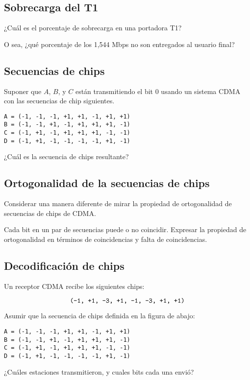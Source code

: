 \documentclass[12pt]{report}
\begin{document}
\begin{exer}
\subsection{Sobrecarga del T1 \sthree}
¿Cuál es el porcentaje de sobrecarga en una portadora T1?

O sea, ¿qué porcentaje de los 1,544 Mbps no son entregados al usuario final?
\end{exer}

\begin{exer}
\subsection{Secuencias de chips \sone}
Suponer que $A$, $B$, y $C$ están transmitiendo el bit 0 usando un sistema CDMA con
las secuencias de chip siguientes.\\


\begin{verbatim}
A = (-1, -1, -1, +1, +1, -1, +1, +1)
B = (-1, -1, +1, -1, +1, +1, +1, -1)
C = (-1, +1, -1, +1, +1, +1, -1, -1)
D = (-1, +1, -1, -1, -1, -1, +1, -1)
\end{verbatim}


¿Cuál es la secuencia de chips resultante?
\end{exer}

\begin{exer}
\subsection{Ortogonalidad de la secuencias de chips \sone \steo}
Considerar una manera diferente de mirar la propiedad de ortogonalidad de secuencias de chips de CDMA.

Cada bit en un par de secuencias puede o no coincidir. Expresar la propiedad de ortogonalidad en términos de coincidencias y falta de coincidencias.
\end{exer}

\begin{exer}
\subsection{Decodificación de chips \sthree}
Un receptor CDMA recibe los siguientes chips:

$$\texttt{(-1, +1, -3, +1, -1, -3, +1, +1)}$$

Asumir que la secuencia de chips definida en la figura de abajo:\\

\begin{verbatim}
A = (-1, -1, -1, +1, +1, -1, +1, +1)
B = (-1, -1, +1, -1, +1, +1, +1, -1)
C = (-1, +1, -1, +1, +1, +1, -1, -1)
D = (-1, +1, -1, -1, -1, -1, +1, -1)
\end{verbatim}

¿Cuáles estaciones transmitieron, y cuales bits cada una envió?
\end{exer}
\end{document}
